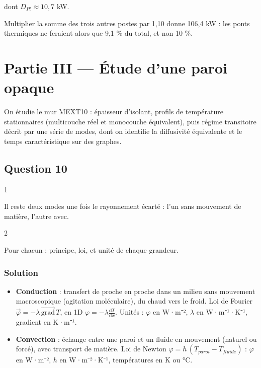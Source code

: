 \documentclass[11pt,a4paper]{article}
\providecommand{\tightlist}{\setlength{\itemsep}{0pt}\setlength{\parskip}{0pt}}
\newcommand{\equationajustee}[1]{%
  \sbox{\boiteequation}{$\displaystyle #1$}%
  \ifdim\wd\boiteequation>\linewidth
    \[\resizebox{\linewidth}{!}{\usebox{\boiteequation}}\]%
  \else
    \[#1\]%
  \fi}
\begin{document}
\equationajustee{\boxed{D_{tot\_\text{bâti}}\approx107{,}5\ \text{kW}}}

dont \(D_{Pt}\approx10{,}7\) kW.

\begin{piege}

Multiplier la somme des trois autres postes par 1,10 donne 106,4 kW : les ponts thermiques ne feraient alors que 9,1 \% du total, et non 10 \%.

\end{piege}

\hypertarget{partie-iii-uxe9tude-dune-paroi-opaque}{%
\section{Partie III --- Étude d'une paroi opaque}\label{partie-iii-uxe9tude-dune-paroi-opaque}}

On étudie le mur MEXT10 : épaisseur d'isolant, profils de température stationnaires (multicouche réel et monocouche équivalent), puis régime transitoire décrit par une série de modes, dont on identifie la diffusivité équivalente et le temps caractéristique sur des graphes.

\hypertarget{question-10}{%
\subsection{Question 10}\label{question-10}}

\begin{indication}{1}

Il reste deux modes une fois le rayonnement écarté : l'un sans mouvement de matière, l'autre avec.

\end{indication}

\begin{indication}{2}

Pour chacun : principe, loi, et unité de chaque grandeur.

\end{indication}

\hypertarget{solution-9}{%
\subsubsection{Solution}\label{solution-9}}

\begin{itemize}
\tightlist
\item
  \textbf{Conduction} : transfert de proche en proche dans un milieu sans mouvement macroscopique (agitation moléculaire), du chaud vers le froid. Loi de Fourier \(\vec\varphi=-\lambda\,\overrightarrow{\text{grad}}\,T\), en 1D \(\varphi=-\lambda\frac{\mathrm dT}{\mathrm dx}\). Unités : \(\varphi\) en W·m⁻², \(\lambda\) en W·m⁻¹·K⁻¹, gradient en K·m⁻¹.
\item
  \textbf{Convection} : échange entre une paroi et un fluide en mouvement (naturel ou forcé), avec transport de matière. Loi de Newton \(\varphi=h\,(T_{paroi}-T_{fluide})\) : \(\varphi\) en W·m⁻², \(h\) en W·m⁻²·K⁻¹, températures en K ou °C.
\end{itemize}
\end{document}
